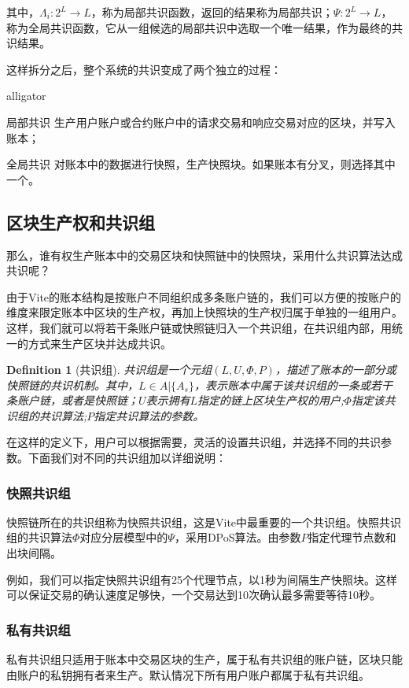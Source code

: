 \documentclass[UTF8,nofonts]{ctexart}
\newtheorem{definition}{Definition}[section]
\begin{document}
\begin{multicols}{2}
其中，$\Lambda_i: 2^L \rightarrow L$，称为局部共识函数，返回的结果称为局部共识；$\Psi: 2^L \rightarrow L$，称为全局共识函数，它从一组候选的局部共识中选取一个唯一结果，作为最终的共识结果。

这样拆分之后，整个系统的共识变成了两个独立的过程：
\begin{labeling}{alligator}
\item [局部共识] 生产用户账户或合约账户中的请求交易和响应交易对应的区块，并写入账本；
\item [全局共识] 对账本中的数据进行快照，生产快照块。如果账本有分叉，则选择其中一个。
\end{labeling}

\subsection{区块生产权和共识组}
那么，谁有权生产账本中的交易区块和快照链中的快照块，采用什么共识算法达成共识呢？

由于Vite的账本结构是按账户不同组织成多条账户链的，我们可以方便的按账户的维度来限定账本中区块的生产权，再加上快照块的生产权归属于单独的一组用户。这样，我们就可以将若干条账户链或快照链归入一个共识组，在共识组内部，用统一的方式来生产区块并达成共识。

\begin{definition}[共识组]
共识组是一个元组$(L, U, \Phi, P)$，描述了账本的一部分或快照链的共识机制。其中，$L \in A \vert \{ A_s \}$，表示账本中属于该共识组的一条或若干条账户链，或者是快照链；$U$表示拥有$L$指定的链上区块生产权的用户;$\Phi$指定该共识组的共识算法;$P$指定共识算法的参数。
\end{definition}

在这样的定义下，用户可以根据需要，灵活的设置共识组，并选择不同的共识参数。下面我们对不同的共识组加以详细说明：

\subsubsection{快照共识组}
快照链所在的共识组称为快照共识组，这是Vite中最重要的一个共识组。快照共识组的共识算法$\Phi$对应分层模型中的$\Psi$，采用DPoS算法。由参数$P$指定代理节点数和出块间隔。

例如，我们可以指定快照共识组有25个代理节点，以1秒为间隔生产快照块。这样可以保证交易的确认速度足够快，一个交易达到10次确认最多需要等待10秒。

\subsubsection{私有共识组}
私有共识组只适用于账本中交易区块的生产，属于私有共识组的账户链，区块只能由账户的私钥拥有者来生产。默认情况下所有用户账户都属于私有共识组。


\end{multicols}
\end{document}
